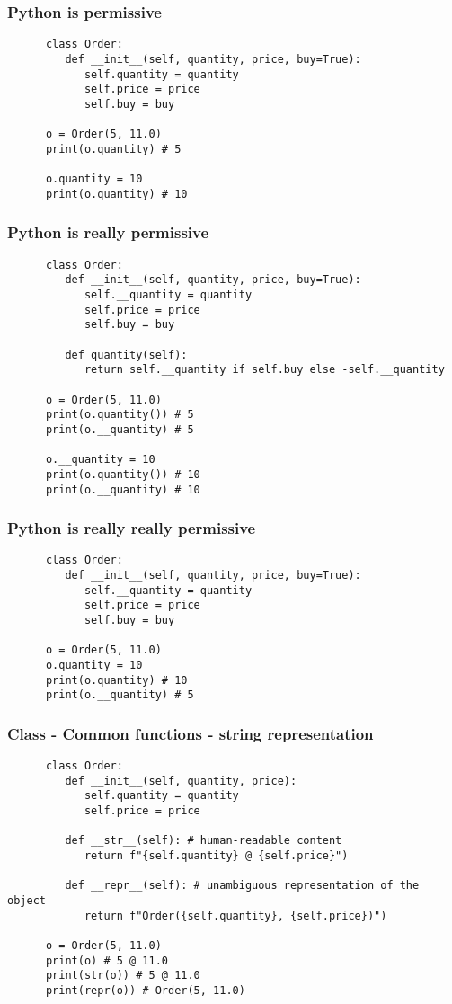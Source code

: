 \begin{frame}[fragile]
\frametitle{Python is permissive}
   \begin{verbatim}
      class Order:
         def __init__(self, quantity, price, buy=True):
            self.quantity = quantity
            self.price = price
            self.buy = buy

      o = Order(5, 11.0)
      print(o.quantity) # 5

      o.quantity = 10
      print(o.quantity) # 10
   \end{verbatim}
\end{frame}

\begin{frame}[fragile]
\frametitle{Python is really permissive}
   \begin{verbatim}
      class Order:
         def __init__(self, quantity, price, buy=True):
            self.__quantity = quantity
            self.price = price
            self.buy = buy

         def quantity(self):
            return self.__quantity if self.buy else -self.__quantity

      o = Order(5, 11.0)
      print(o.quantity()) # 5
      print(o.__quantity) # 5

      o.__quantity = 10
      print(o.quantity()) # 10
      print(o.__quantity) # 10
   \end{verbatim}
\end{frame}

\begin{frame}[fragile]
\frametitle{Python is really really permissive}
   \begin{verbatim}
      class Order:
         def __init__(self, quantity, price, buy=True):
            self.__quantity = quantity
            self.price = price
            self.buy = buy

      o = Order(5, 11.0)
      o.quantity = 10
      print(o.quantity) # 10
      print(o.__quantity) # 5
   \end{verbatim}
\end{frame}

\begin{frame}[fragile]
\frametitle{Class - Common functions - string representation}
   \begin{verbatim}
      class Order:
         def __init__(self, quantity, price):
            self.quantity = quantity
            self.price = price

         def __str__(self): # human-readable content
            return f"{self.quantity} @ {self.price}")

         def __repr__(self): # unambiguous representation of the object
            return f"Order({self.quantity}, {self.price})")

      o = Order(5, 11.0)
      print(o) # 5 @ 11.0
      print(str(o)) # 5 @ 11.0
      print(repr(o)) # Order(5, 11.0)
   \end{verbatim}
\end{frame}

